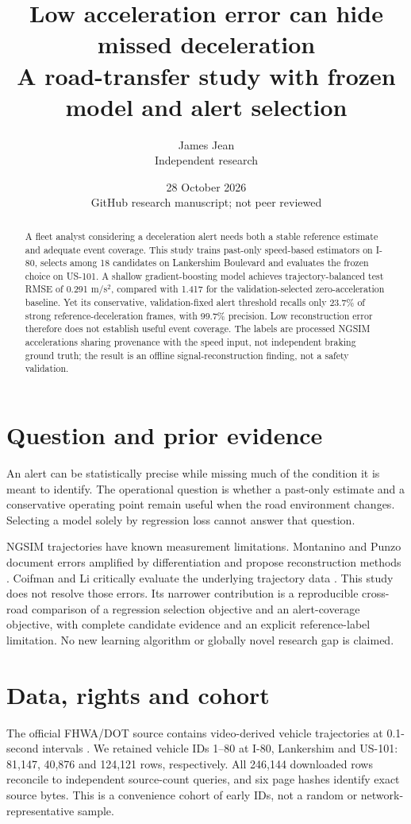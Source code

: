 \documentclass[11pt]{article}
\author{James Jean\\\small Independent research}
\date{28 October 2026\\\small GitHub research manuscript; not peer reviewed}
\title{\color{ink}Low acceleration error can hide missed deceleration\\[4pt]\large A road-transfer study with frozen model and alert selection}
\begin{document}
\maketitle
\begin{abstract}
A fleet analyst considering a deceleration alert needs both a stable reference estimate and adequate event coverage. This study trains past-only speed-based estimators on I-80, selects among 18 candidates on Lankershim Boulevard and evaluates the frozen choice on US-101. A shallow gradient-boosting model achieves trajectory-balanced test RMSE of 0.291 m/s$^2$, compared with 1.417 for the validation-selected zero-acceleration baseline. Yet its conservative, validation-fixed alert threshold recalls only 23.7\% of strong reference-deceleration frames, with 99.7\% precision. Low reconstruction error therefore does not establish useful event coverage. The labels are processed NGSIM accelerations sharing provenance with the speed input, not independent braking ground truth; the result is an offline signal-reconstruction finding, not a safety validation.
\end{abstract}

\section{Question and prior evidence}
An alert can be statistically precise while missing much of the condition it is meant to identify. The operational question is whether a past-only estimate and a conservative operating point remain useful when the road environment changes. Selecting a model solely by regression loss cannot answer that question.

NGSIM trajectories have known measurement limitations. Montanino and Punzo document errors amplified by differentiation and propose reconstruction methods \cite{montanino}. Coifman and Li critically evaluate the underlying trajectory data \cite{coifman}. This study does not resolve those errors. Its narrower contribution is a reproducible cross-road comparison of a regression selection objective and an alert-coverage objective, with complete candidate evidence and an explicit reference-label limitation. No new learning algorithm or globally novel research gap is claimed.

\section{Data, rights and cohort}
The official FHWA/DOT source contains video-derived vehicle trajectories at 0.1-second intervals \cite{dot}. We retained vehicle IDs 1--80 at I-80, Lankershim and US-101: 81,147, 40,876 and 124,121 rows, respectively. All 246,144 downloaded rows reconcile to independent source-count queries, and six page hashes identify exact source bytes. This is a convenience cohort of early IDs, not a random or network-representative sample.
\end{document}
